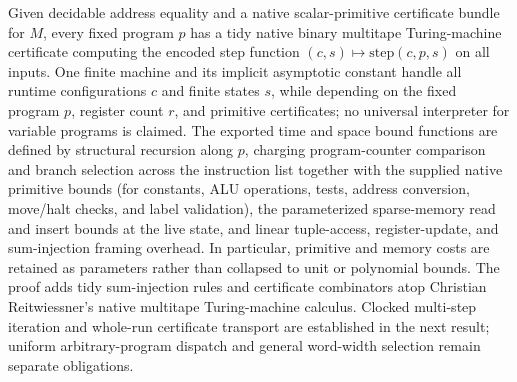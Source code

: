 \begin{result}
Given decidable address equality and a native scalar-primitive certificate bundle for $M$, every
fixed program $p$ has a tidy native binary multitape Turing-machine certificate computing the
encoded step function $(c,s)\mapsto\mathrm{step}(c,p,s)$ on all inputs. One finite machine and its
implicit asymptotic constant handle all runtime configurations $c$ and finite states $s$, while
depending on the fixed program $p$, register count $r$, and primitive certificates; no universal
interpreter for variable programs is claimed. The exported time and space bound functions are
defined by structural recursion along $p$, charging program-counter comparison and branch selection
across the instruction list together with the supplied native primitive bounds (for constants, ALU
operations, tests, address conversion, move/halt checks, and label validation), the parameterized
sparse-memory read and insert bounds at the live state, and linear tuple-access, register-update,
and sum-injection framing overhead. In particular, primitive and memory costs are retained as
parameters rather than collapsed to unit or polynomial bounds. The proof adds tidy sum-injection
rules and certificate combinators atop Christian Reitwiessner's native multitape Turing-machine
calculus. Clocked multi-step iteration and whole-run certificate transport are established in the
next result; uniform arbitrary-program dispatch and general word-width selection remain separate
obligations.\citep{CookReckhow1973,Sipser2013}

\end{result}
